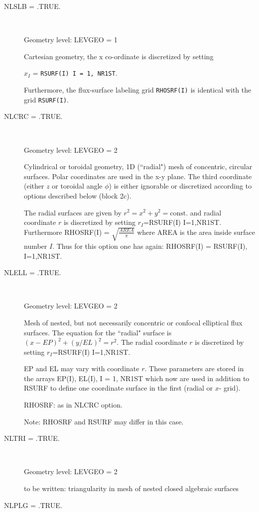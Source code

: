 \begin{description}
  \item[NLSLB = .TRUE.] ~

        Geometry level: LEVGEO = 1 

        Cartesian geometry, the x co-ordinate is discretized by setting

        $x_I$ = \lstinline|RSURF(I) I = 1, NR1ST|.

        Furthermore, the flux-surface labeling grid \lstinline|RHOSRF(I)| is identical
        with the grid \lstinline|RSURF(I)|.
  \item[NLCRC = .TRUE.] ~

        Geometry level: LEVGEO = 2 

        Cylindrical or toroidal geometry, 1D (``radial") mesh of concentric, circular
        surfaces.
        Polar coordinates are used in the x-y plane.
        The third coordinate (either $z$ or toroidal angle $\phi$) is either ignorable
        or discretized according to options described below (block 2c).

        The radial surfaces are given by $r^2 = x^2 + y^2 = \mathrm{const.}$ and radial
        coordinate $r$ is discretized by setting $r_I$=RSURF(I) I=1,NR1ST.
        Furthermore RHOSRF(I) = $\sqrt{\frac{AREA}{\pi}}$ where AREA is the area inside
        surface number $I$.
        Thus for this option one has again: RHOSRF(I) = RSURF(I), I=1,NR1ST.
  \item[NLELL = .TRUE.] ~

        Geometry level: LEVGEO = 2 

        Mesh of nested, but not necessarily concentric or confocal elliptical flux
        surfaces.
        The equation for the ``radial" surface is $(x - EP)^2 + (  y/EL )^2 = r^2$.
        The radial coordinate $r$ is discretized by setting $r_I$=RSURF(I) I=1,NR1ST.

        EP and EL may vary with coordinate $r$.
        These parameters are stored in the arrays EP(I), EL(I), I = 1, NR1ST which now
        are used in addition to RSURF to define one coordinate surface in the first
        (radial or $x$- grid).

        RHOSRF: as in NLCRC option.

        Note: RHOSRF and RSURF may differ in this case.
  \item[NLTRI = .TRUE.] ~

        Geometry level: LEVGEO = 2 

        to be written: triangularity in mesh of nested closed algebraic surfaces
  \item[NLPLG = .TRUE.] ~


\end{description}
